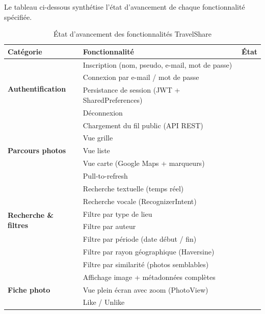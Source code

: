 \documentclass[12pt, a4paper]{report}
\newcommand{\cmark}{\textcolor{success}{\ding{51}}}
\newcommand{\pmark}{\textcolor{warning}{\ding{119}}}
\begin{document}
Le tableau ci-dessous synthétise l'état d'avancement de chaque fonctionnalité spécifiée.

\begin{table}[H]
\centering
\caption{État d'avancement des fonctionnalités TravelShare}
\renewcommand{\arraystretch}{1.4}
\begin{tabularx}{\textwidth}{lXc}
\toprule
\rowcolor{primary!20}
\textbf{Catégorie} & \textbf{Fonctionnalité} & \textbf{État} \\
\midrule
\multirow{4}{*}{\textbf{Authentification}}
  & Inscription (nom, pseudo, e-mail, mot de passe) & \cmark \\
  & Connexion par e-mail / mot de passe              & \cmark \\
  & Persistance de session (JWT + SharedPreferences) & \cmark \\
  & Déconnexion                                      & \cmark \\
\midrule
\multirow{5}{*}{\textbf{Parcours photos}}
  & Chargement du fil public (API REST)              & \cmark \\
  & Vue grille                                       & \cmark \\
  & Vue liste                                        & \cmark \\
  & Vue carte (Google Maps + marqueurs)              & \cmark \\
  & Pull-to-refresh                                  & \cmark \\
\midrule
\multirow{6}{*}{\textbf{Recherche \& filtres}}
  & Recherche textuelle (temps réel)                 & \cmark \\
  & Recherche vocale (RecognizerIntent)              & \cmark \\
  & Filtre par type de lieu                          & \cmark \\
  & Filtre par auteur                                & \cmark \\
  & Filtre par période (date début / fin)            & \cmark \\
  & Filtre par rayon géographique (Haversine)        & \cmark \\
  & Filtre par similarité (photos semblables)        & \pmark \\
\midrule
\multirow{6}{*}{\textbf{Fiche photo}}
  & Affichage image + métadonnées complètes          & \cmark \\
  & Vue plein écran avec zoom (PhotoView)            & \cmark \\
  & Like / Unlike                                    & \cmark \\

\end{tabularx}
\end{table}
\end{document}
